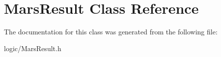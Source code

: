 \hypertarget{classMarsResult}{}\section{Mars\+Result Class Reference}
\label{classMarsResult}


The documentation for this class was generated from the following file\+:\begin{DoxyCompactItemize}
\item 
logic/Mars\+Result.\+h\end{DoxyCompactItemize}
